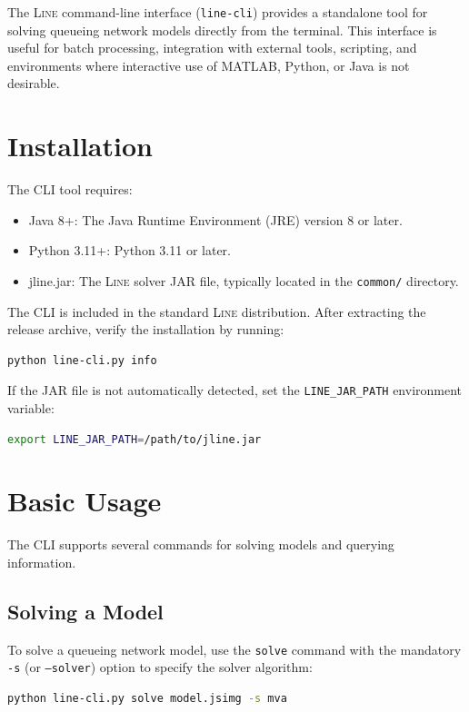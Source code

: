 The \textsc{Line} command-line interface (\texttt{line-cli}) provides a standalone tool for solving queueing network models directly from the terminal. This interface is useful for batch processing, integration with external tools, scripting, and environments where interactive use of MATLAB, Python, or Java is not desirable.

\section{Installation}
\label{cli-installation}

The CLI tool requires:
\begin{itemize}
\item {Java 8+}: The Java Runtime Environment (JRE) version 8 or later.
\item {Python 3.11+}: Python 3.11 or later.
\item {jline.jar}: The \textsc{Line} solver JAR file, typically located in the \texttt{common/} directory.
\end{itemize}

The CLI is included in the standard \textsc{Line} distribution. After extracting the release archive, verify the installation by running:
\begin{lstlisting}[language=bash, basicstyle=\ttfamily\footnotesize]
python line-cli.py info
\end{lstlisting}

If the JAR file is not automatically detected, set the \texttt{LINE\_JAR\_PATH} environment variable:
\begin{lstlisting}[language=bash, basicstyle=\ttfamily\footnotesize]
export LINE_JAR_PATH=/path/to/jline.jar
\end{lstlisting}

\section{Basic Usage}
\label{cli-basic-usage}

The CLI supports several commands for solving models and querying information.

\subsection{Solving a Model}
To solve a queueing network model, use the \texttt{solve} command with the mandatory \texttt{-s} (or \texttt{--solver}) option to specify the solver algorithm:
\begin{lstlisting}[language=bash, basicstyle=\ttfamily\footnotesize]
python line-cli.py solve model.jsimg -s mva
\end{lstlisting}

